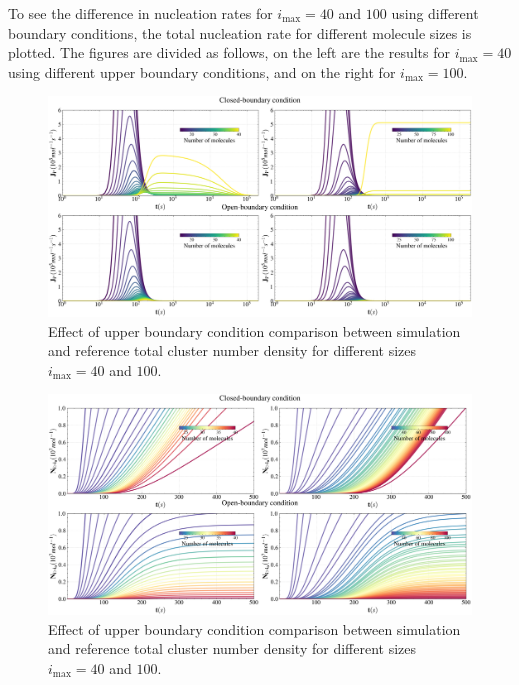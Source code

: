 To see the difference in nucleation rates for $i_{\text{max}} = 40$ and $100$ using different boundary conditions, 
the total nucleation rate for different molecule sizes is plotted.
The figures are divided as follows, on the left are the results for $i_{\text{max}} = 40$ using different upper boundary conditions, and on the right for $i_{\text{max}} = 100$.
\begin{figure}[H]
    \centering
    \hspace*{-2cm} %
    \includegraphics[width=1.2\linewidth]{laszlo_results/rate_evolution_comparison.png}
    \caption{Effect of upper boundary condition comparison between simulation and reference total cluster number density for different sizes $i_{\text{max}} = 40$ and $100$.}
    \label{fig:rate_evolution_comparison}
\end{figure}

\begin{figure}[H]
    \centering
    \hspace*{-2cm} %
    \includegraphics[width=1.2\linewidth]{laszlo_results/number_evolution_comparison.png}
    \caption{Effect of upper boundary condition comparison between simulation and reference total cluster number density for different sizes $i_{\text{max}} = 40$ and $100$.}
    \label{fig:number_evolution_comparison}
\end{figure}


